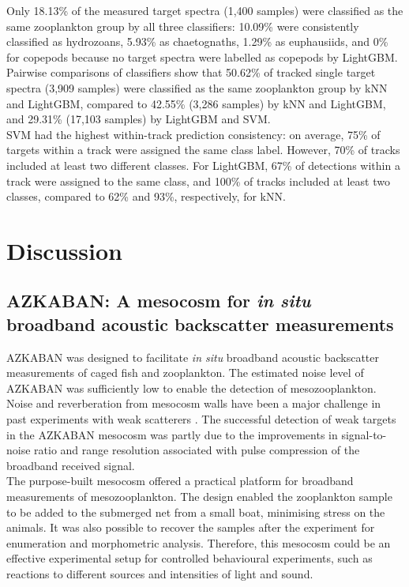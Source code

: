 Only 18.13\% of the measured target spectra (1,400 samples) were classified as the same zooplankton group by all three classifiers: 10.09\% were consistently classified as hydrozoans, 5.93\% as chaetognaths, 1.29\% as euphausiids, and 0\% for copepods because no target spectra were labelled as copepods by LightGBM. Pairwise comparisons of classifiers show that 50.62\% of tracked single target spectra (3,909 samples) were classified as the same zooplankton group by kNN and LightGBM, compared to 42.55\% (3,286 samples) by kNN and LightGBM, and 29.31\% (17,103 samples) by LightGBM and SVM. \\
SVM had the highest within-track prediction consistency: on average, 75\% of targets within a track were assigned the same class label. However, 70\% of tracks included at least two different classes. For LightGBM, 67\% of detections within a track were assigned to the same class, and 100\% of tracks included at least two classes, compared to 62\% and 93\%, respectively, for kNN.

\section{Discussion}
\subsection{AZKABAN: A mesocosm for \textit{in situ} broadband acoustic backscatter measurements}
AZKABAN was designed to facilitate \textit{in situ} broadband acoustic backscatter measurements of caged fish and zooplankton. The estimated noise level of AZKABAN was sufficiently low to enable the detection of mesozooplankton. Noise and reverberation from mesocosm walls have been a major challenge in past experiments with weak scatterers \citep{Knutsen1997}. The successful detection of weak targets in the AZKABAN mesocosm was partly due to the improvements in signal-to-noise ratio and range resolution associated with pulse compression of the broadband received signal.\\
The purpose-built mesocosm offered a practical platform for broadband measurements of mesozooplankton. The design enabled the zooplankton sample to be added to the submerged net from a small boat, minimising stress on the animals. It was also possible to recover the samples after the experiment for enumeration and morphometric analysis. Therefore, this mesocosm could be an effective experimental setup for controlled behavioural experiments, such as reactions to different sources and intensities of light and sound.

